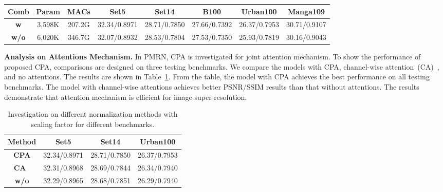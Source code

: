\documentclass[journal]{IEEEtran}
\begin{document}
\begin{table*}
	\centering
	\caption{Investigation on recursive combination in PMRB with scaling factor  on different benchmarks.}
	\label{tab:abl_3x3}
	\begin{tabular}{|c|c|c|c|c|c|c|c|}
		\hline  
		\textbf{Comb}&\textbf{Param}& \textbf{MACs}& \textbf{Set5}& \textbf{Set14}& \textbf{B100} &\textbf{Urban100}& \textbf{Manga109}\\
		\hline
		\hline
		\textbf{w}& 3,598K& 207.2G&32.34/0.8971& 28.71/0.7850& 27.66/0.7392& 26.37/0.7953& 30.71/0.9107\\ 
		\textbf{w/o}& 6,020K& 346.7G&32.07/0.8932& 28.53/0.7804& 27.53/0.7350& 25.93/0.7819& 30.16/0.9043\\
		\hline
	\end{tabular}
\end{table*}




\textbf{Analysis on Attentions Mechanism.}
In PMRN, CPA is investigated for joint attention mechanism. To show the performance of proposed CPA, comparisons are designed on three testing benchmarks. We compare the models with CPA, channel-wise attention~(CA)~\cite{senet_hu2018}, and no attentions. The results are shown in Table~\ref{tab:abl_norm}.
From the table, the model with CPA achieves the best performance on all testing benchmarks. The model with channel-wise attentions achieves better PSNR/SSIM results than that without attentions. The results demonstrate that attention mechanism is efficient for image super-resolution.

\begin{table}
	\centering
	\caption{Investigation on different normalization methods with scaling factor  for different benchmarks.}
	\label{tab:abl_norm}
	\begin{tabular}{|c|c|c|c|}
		\hline  
		\textbf{Method}& \textbf{Set5}& \textbf{Set14}& \textbf{Urban100}\\
		\hline
		\hline
		\textbf{CPA}	& 32.34/0.8971& 28.71/0.7850& 26.37/0.7953\\ 
		\textbf{CA~\cite{senet_hu2018}}	& 32.31/0.8968& 28.69/0.7844& 26.34/0.7940\\
		\textbf{w/o}		& 32.29/0.8965& 28.68/0.7851& 26.29/0.7940\\
		\hline
	\end{tabular}
\end{table}
\end{document}

